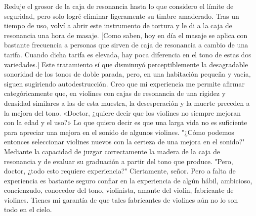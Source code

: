 Reduje el grosor de la caja de resonancia hasta lo que considero el límite de seguridad, pero solo logré eliminar ligeramente su timbre amaderado. Tras un tiempo de uso, volví a abrir este instrumento de tortura y le di a la caja de resonancia una hora de masaje.
[Como saben, hoy en día el masaje se aplica con bastante frecuencia a personas que sirven de caja de resonancia a cambio de una tarifa. Cuando dicha tarifa es elevada, hay poca diferencia en el
tono de estas dos variedades.]
Este tratamiento sí que disminuyó perceptiblemente la desagradable sonoridad de los tonos de doble parada, pero, en una habitación pequeña y vacía, siguen sugiriendo autodestrucción.
Creo que mi experiencia me permite afirmar categóricamente que, en violines con cajas de resonancia de una rigidez y densidad similares a las de esta muestra, la desesperación y la muerte preceden a la mejora del tono.
«Doctor, ¿quiere decir que los violines no siempre mejoran con la edad y el uso?»
Lo que quiero decir es que una larga vida no es suficiente para apreciar una mejora en el sonido de algunos violines.
"¿Cómo podemos entonces seleccionar violines nuevos con la certeza de una mejora en el sonido?"
Mediante la capacidad de juzgar correctamente la madera de la caja de resonancia y de evaluar su graduación a partir del tono que produce.
"Pero, doctor, ¿todo esto requiere experiencia?"
Ciertamente, señor. Pero a falta de experiencia es bastante seguro confiar en la experiencia de algún hábil,
ambicioso, concienzudo, conocedor del tono, violinista, amante del violín, fabricante de violines. Tienes mi
garantía de que tales fabricantes de violines aún no lo son
todo en el cielo.
